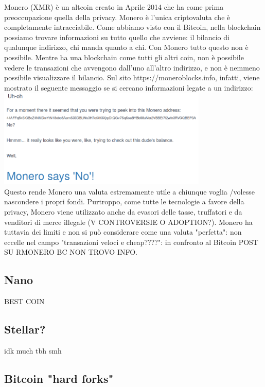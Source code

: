 \documentclass {article}
\begin{document}
Monero (XMR) è un altcoin creato in Aprile 2014 che ha come prima preoccupazione quella della privacy.
Monero è l'unica criptovaluta che è completamente intracciabile. Come abbiamo visto con il Bitcoin, nella blockchain possiamo trovare informazioni su tutto quello che avviene: il bilancio di qualunque indirizzo, chi manda quanto a chi.
Con Monero tutto questo non è possibile. Mentre ha una blockchain come tutti gli altri coin, non è possibile vedere le transazioni che avvengono dall'uno all'altro indirizzo, e non è nemmeno possibile visualizzare il bilancio.
Sul sito https://moneroblocks.info, infatti, viene mostrato il seguente messaggio se si cercano informazioni legate a un indirizzo:\\

\vspace {0.5cm}
\includegraphics [width = 10cm] {media/monero.png}
\vspace {0.5cm}
\\
Questo rende Monero una valuta estremamente utile a chiunque voglia /volesse nascondere i propri fondi.
Purtroppo, come tutte le tecnologie a favore della privacy, Monero viene utilizzato anche da evasori delle tasse, truffatori e da venditori di merce illegale (V CONTROVERSIE O ADOPTION?).
Monero ha tuttavia dei limiti e non si può considerare come una valuta "perfetta": non eccelle nel campo "transazioni veloci e cheap????": in confronto al Bitcoin POST SU RMONERO BC NON TROVO INFO.


\subsection {Nano}


BEST COIN


\subsection {Stellar?}


idk much tbh smh


\subsection {Bitcoin "hard forks"}
\end{document}
